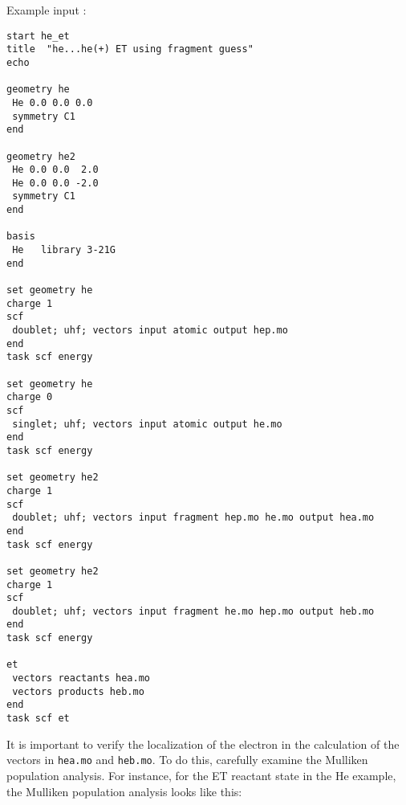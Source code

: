Example input :
\begin{verbatim}
start he_et
title  "he...he(+) ET using fragment guess"
echo

geometry he
 He 0.0 0.0 0.0
 symmetry C1
end

geometry he2
 He 0.0 0.0  2.0
 He 0.0 0.0 -2.0
 symmetry C1
end

basis
 He   library 3-21G
end

set geometry he
charge 1
scf
 doublet; uhf; vectors input atomic output hep.mo
end
task scf energy

set geometry he
charge 0
scf
 singlet; uhf; vectors input atomic output he.mo
end
task scf energy

set geometry he2
charge 1
scf
 doublet; uhf; vectors input fragment hep.mo he.mo output hea.mo
end
task scf energy 

set geometry he2
charge 1
scf
 doublet; uhf; vectors input fragment he.mo hep.mo output heb.mo
end
task scf energy

et
 vectors reactants hea.mo 
 vectors products heb.mo
end
task scf et

\end{verbatim}
It is important to verify the localization of the electron in the calculation 
of the vectors in \verb+hea.mo+ and \verb+heb.mo+. To do this, carefully examine the Mulliken population
analysis.  For instance, for the ET reactant state in the He example, the Mulliken population
analysis looks like this:

